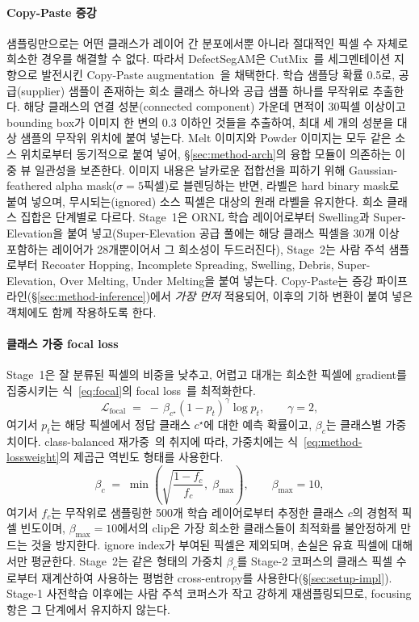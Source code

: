 \paragraph{Copy-Paste 증강}
샘플링만으로는 어떤 클래스가 레이어 간 분포에서뿐 아니라 절대적인
픽셀 수 자체로 희소한 경우를 해결할 수 없다. 따라서 DefectSegAM은
CutMix~\cite{Yun2019CutMix}를 세그멘테이션 지향으로 발전시킨
Copy-Paste augmentation~\cite{Ghiasi2021CopyPaste}을 채택한다. 학습
샘플당 확률 0.5로, 공급(supplier) 샘플이 존재하는 희소 클래스 하나와
공급 샘플 하나를 무작위로 추출한다. 해당 클래스의 연결
성분(connected component) 가운데 면적이 30픽셀 이상이고 bounding
box가 이미지 한 변의 0.3 이하인 것들을 추출하여, 최대 세 개의 성분을
대상 샘플의 무작위 위치에 붙여 넣는다. Melt 이미지와 Powder 이미지는
모두 같은 소스 위치로부터 동기적으로 붙여 넣어,
\S\ref{sec:method-arch}의 융합 모듈이 의존하는 이중 뷰 일관성을
보존한다. 이미지 내용은 날카로운 접합선을 피하기 위해
Gaussian-feathered alpha mask($\sigma = 5$픽셀)로 블렌딩하는 반면,
라벨은 hard binary mask로 붙여 넣으며, 무시되는(ignored) 소스 픽셀은
대상의 원래 라벨을 유지한다. 희소 클래스 집합은 단계별로 다르다.
Stage~1은 ORNL 학습 레이어로부터 Swelling과 Super-Elevation을 붙여
넣고(Super-Elevation 공급 풀에는 해당 클래스 픽셀을 30개 이상 포함하는
레이어가 28개뿐이어서 그 희소성이 두드러진다), Stage~2는 사람 주석
샘플로부터 Recoater Hopping, Incomplete Spreading, Swelling, Debris,
Super-Elevation, Over Melting, Under Melting을 붙여 넣는다.
Copy-Paste는 증강 파이프라인(\S\ref{sec:method-inference})에서
\emph{가장 먼저} 적용되어, 이후의 기하 변환이 붙여 넣은 객체에도 함께
작용하도록 한다.

\paragraph{클래스 가중 focal loss}
Stage~1은 잘 분류된 픽셀의 비중을 낮추고, 어렵고 대개는 희소한 픽셀에
gradient를 집중시키는 식~\eqref{eq:focal}의 focal loss~\cite{Lin2017FocalLoss}를 최적화한다.
\begin{equation}
\mathcal{L}_{\mathrm{focal}}
\;=\; -\,\beta_{c^{\star}} \left(1 - p_{t}\right)^{\gamma} \log p_{t},
\qquad \gamma = 2 ,
\label{eq:focal}
\end{equation}
여기서 $p_t$는 해당 픽셀에서 정답 클래스 $c^{\star}$에 대한 예측
확률이고, $\beta_{c}$는 클래스별 가중치이다. class-balanced 재가중~\cite{Cui2019ClassBalanced}의 취지에 따라, 가중치에는
식~\eqref{eq:method-lossweight}의 제곱근 역빈도 형태를 사용한다.
\begin{equation}
\beta_c \;=\; \min\!\left( \sqrt{\frac{1 - f_c}{f_c}},\; \beta_{\max}
\right), \qquad \beta_{\max} = 10 ,
\label{eq:method-lossweight}
\end{equation}
여기서 $f_c$는 무작위로 샘플링한 500개 학습 레이어로부터 추정한
클래스 $c$의 경험적 픽셀 빈도이며, $\beta_{\max} = 10$에서의 clip은
가장 희소한 클래스들이 최적화를 불안정하게 만드는 것을 방지한다.
ignore index가 부여된 픽셀은 제외되며, 손실은 유효 픽셀에 대해서만
평균한다. Stage~2는 같은 형태의 가중치 $\beta_c$를 Stage-2 코퍼스의
클래스 픽셀 수로부터 재계산하여 사용하는 평범한
cross-entropy를 사용한다(\S\ref{sec:setup-impl}). Stage-1
사전학습 이후에는 사람 주석 코퍼스가 작고 강하게 재샘플링되므로,
focusing 항은 그 단계에서 유지하지 않는다.

